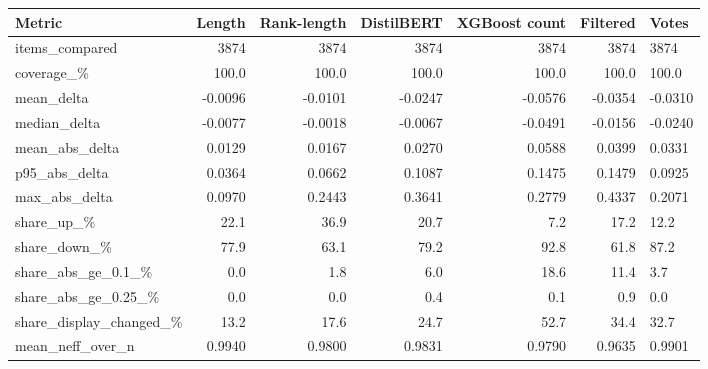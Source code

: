 \begin{tabular}{lrrrrr}
\hline
Metric & Length & Rank-length & DistilBERT & XGBoost count & Filtered & Votes \\
\hline
items\_compared & 3874 & 3874 & 3874 & 3874 & 3874 & 3874 \\
\hline
coverage\_\% & 100.0 & 100.0 & 100.0 & 100.0 & 100.0 & 100.0 \\
\hline
mean\_delta & -0.0096 & -0.0101 & -0.0247 & -0.0576 & -0.0354 & -0.0310 \\
\hline
median\_delta & -0.0077 & -0.0018 & -0.0067 & -0.0491 & -0.0156 & -0.0240 \\
\hline
mean\_abs\_delta & 0.0129 & 0.0167 & 0.0270 & 0.0588 & 0.0399 & 0.0331 \\
\hline
p95\_abs\_delta & 0.0364 & 0.0662 & 0.1087 & 0.1475 & 0.1479 & 0.0925 \\
\hline
max\_abs\_delta & 0.0970 & 0.2443 & 0.3641 & 0.2779 & 0.4337 & 0.2071 \\
\hline
share\_up\_\% & 22.1 & 36.9 & 20.7 & 7.2 & 17.2 & 12.2 \\
\hline
share\_down\_\% & 77.9 & 63.1 & 79.2 & 92.8 & 61.8 & 87.2 \\
\hline
share\_abs\_ge\_0.1\_\% & 0.0 & 1.8 & 6.0 & 18.6 & 11.4 & 3.7 \\
\hline
share\_abs\_ge\_0.25\_\% & 0.0 & 0.0 & 0.4 & 0.1 & 0.9 & 0.0 \\
\hline
share\_display\_changed\_\% & 13.2 & 17.6 & 24.7 & 52.7 & 34.4 & 32.7 \\
\hline
mean\_neff\_over\_n & 0.9940 & 0.9800 & 0.9831 & 0.9790 & 0.9635 & 0.9901 \\
\hline
\end{tabular}
